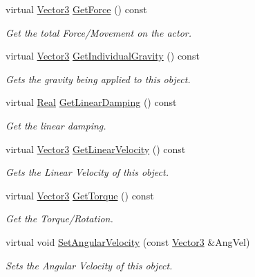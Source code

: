 \begin{DoxyCompactItemize}
virtual \hyperlink{classphys_1_1Vector3}{Vector3} \hyperlink{classphys_1_1ActorRigidPhysicsSettings_a6e9b49a990b04411e5a2a29372cafa85}{GetForce} () const 
\begin{DoxyCompactList}\small\item\em Get the total Force/Movement on the actor. \item\end{DoxyCompactList}\item 
virtual \hyperlink{classphys_1_1Vector3}{Vector3} \hyperlink{classphys_1_1ActorRigidPhysicsSettings_ac581da07915d7c09d92b251f60b17090}{GetIndividualGravity} () const 
\begin{DoxyCompactList}\small\item\em Gets the gravity being applied to this object. \item\end{DoxyCompactList}\item 
virtual \hyperlink{namespacephys_af7eb897198d265b8e868f45240230d5f}{Real} \hyperlink{classphys_1_1ActorRigidPhysicsSettings_af81213793393bec576a60d943ff461d0}{GetLinearDamping} () const 
\begin{DoxyCompactList}\small\item\em Get the linear damping. \item\end{DoxyCompactList}\item 
virtual \hyperlink{classphys_1_1Vector3}{Vector3} \hyperlink{classphys_1_1ActorRigidPhysicsSettings_adbd0280f78f4a40891d3130835e0111a}{GetLinearVelocity} () const 
\begin{DoxyCompactList}\small\item\em Gets the Linear Velocity of this object. \item\end{DoxyCompactList}\item 
virtual \hyperlink{classphys_1_1Vector3}{Vector3} \hyperlink{classphys_1_1ActorRigidPhysicsSettings_a0e72a68536fa4e48b489bd069f5fba82}{GetTorque} () const 
\begin{DoxyCompactList}\small\item\em Get the Torque/Rotation. \item\end{DoxyCompactList}\item 
virtual void \hyperlink{classphys_1_1ActorRigidPhysicsSettings_a222c6ea9a61937cf7cb053c194981e41}{SetAngularVelocity} (const \hyperlink{classphys_1_1Vector3}{Vector3} \&AngVel)
\begin{DoxyCompactList}\small\item\em Sets the Angular Velocity of this object. \item\end{DoxyCompactList}\item 

\end{DoxyCompactItemize}
